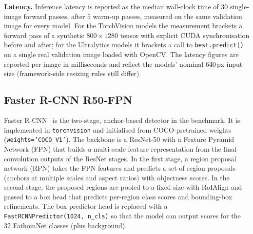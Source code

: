 \documentclass[11pt,a4paper,twocolumn]{article}
\begin{document}
\textbf{Latency.} Inference latency is reported as the median wall-clock time of
$30$ single-image forward passes, after $5$ warm-up passes, measured on the same
validation image for every model. For the TorchVision models the measurement
brackets a forward pass of a synthetic $800\times1280$ tensor with explicit
CUDA synchronisation before and after; for the Ultralytics models it brackets a
call to \texttt{best.predict()} on a single real validation image loaded with
OpenCV. The latency figures are reported per image in milliseconds and reflect the
models' nominal 640\,px input size (framework-side resizing rules still differ).


\subsection{Faster R-CNN R50-FPN}
\label{sec:methods-frcnn}

Faster R-CNN~\cite{fasterrcnn2015} is the two-stage, anchor-based detector in the
benchmark. It is implemented in \texttt{torchvision} and initialised from
COCO-pretrained weights (\texttt{weights='COCO\_V1'}). The backbone is a ResNet-50 with
a Feature Pyramid Network (FPN) that builds a multi-scale feature representation from
the final convolution outputs of the ResNet stages. In the first stage, a region proposal
network (RPN) takes the FPN features and predicts a set of region proposals (anchors at
multiple scales and aspect ratios) with objectness scores. In the second stage, the
proposed regions are pooled to a fixed size with RoIAlign and passed to a box head that
predicts per-region class scores and bounding-box refinements. The box predictor head is
replaced with a \texttt{FastRCNNPredictor(1024, n\_cls)} so that the model can output
scores for the $32$ FathomNet classes (plus background).
\end{document}
